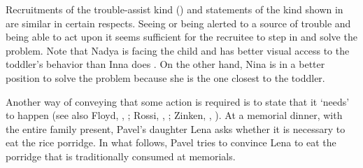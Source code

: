 \documentclass[output=paper,modfonts,nonflat]{langsci/langscibook}
\begin{document}
\hspace*{-.5mm}Recruitments of the trouble-assist kind () and statements of the kind shown in  are similar in certain respects. Seeing or being alerted to a source of trouble and being able to act upon it seems sufficient for the recruitee to step in and solve the problem. Note that Nadya is facing the child and has better visual access to the toddler's behavior than Inna does \citep[see also][]{Rossi2018}. On the other hand, Nina is in a better position to solve the problem because she is the one closest to the toddler.

Another way of conveying that some action is required is to state that it ‘needs’ to happen (see also Floyd, , ; Rossi, , ; Zinken, , ). At a memorial dinner, with the entire family present, Pavel’s daughter Lena asks whether it is necessary to eat the rice porridge. In what follows, Pavel tries to convince Lena to eat the porridge that is traditionally consumed at memorials.
\end{document}
